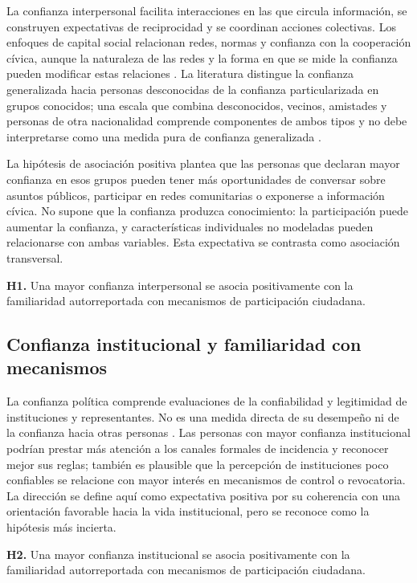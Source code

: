 \documentclass[11pt,letterpaper]{article}
\begin{document}
La confianza interpersonal facilita interacciones en las que circula información, se construyen expectativas de reciprocidad y se coordinan acciones colectivas. Los enfoques de capital social relacionan redes, normas y confianza con la cooperación cívica, aunque la naturaleza de las redes y la forma en que se mide la confianza pueden modificar estas relaciones \citep{Putnam1993}. La literatura distingue la confianza generalizada hacia personas desconocidas de la confianza particularizada en grupos conocidos; una escala que combina desconocidos, vecinos, amistades y personas de otra nacionalidad comprende componentes de ambos tipos y no debe interpretarse como una medida pura de confianza generalizada \citep{DelheyNewton2005}.

La hipótesis de asociación positiva plantea que las personas que declaran mayor confianza en esos grupos pueden tener más oportunidades de conversar sobre asuntos públicos, participar en redes comunitarias o exponerse a información cívica. No supone que la confianza produzca conocimiento: la participación puede aumentar la confianza, y características individuales no modeladas pueden relacionarse con ambas variables. Esta expectativa se contrasta como asociación transversal.

\noindent\textbf{H1.} Una mayor confianza interpersonal se asocia positivamente con la familiaridad autorreportada con mecanismos de participación ciudadana.

\subsection{Confianza institucional y familiaridad con mecanismos}

La confianza política comprende evaluaciones de la confiabilidad y legitimidad de instituciones y representantes. No es una medida directa de su desempeño ni de la confianza hacia otras personas \citep{LeviStoker2000}. Las personas con mayor confianza institucional podrían prestar más atención a los canales formales de incidencia y reconocer mejor sus reglas; también es plausible que la percepción de instituciones poco confiables se relacione con mayor interés en mecanismos de control o revocatoria. La dirección se define aquí como expectativa positiva por su coherencia con una orientación favorable hacia la vida institucional, pero se reconoce como la hipótesis más incierta.

\noindent\textbf{H2.} Una mayor confianza institucional se asocia positivamente con la familiaridad autorreportada con mecanismos de participación ciudadana.
\end{document}
